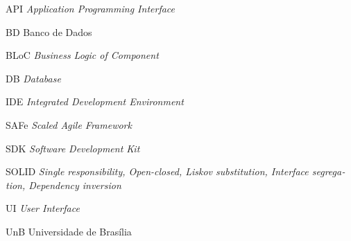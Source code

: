 \documentclass[
	12pt,				%
	oneside,			%
	a4paper,			%
	english,			%
	brazil,				%
	]{abntex2}
\begin{document}

\listoftables*
\cleardoublepage

\begin{siglas}
  \item[API] \foreignlanguage{english}{\textit{Application Programming Interface}}
  \item[BD] Banco de Dados
  \item[BLoC] \foreignlanguage{english}{\textit{Business Logic of Component}}
  \item[DB] \foreignlanguage{english}{\textit{Database}}
  \item[IDE] \foreignlanguage{english}{\textit{Integrated Development Environment}}
  \item[SAFe] \foreignlanguage{english}{\textit{Scaled Agile Framework}}
  \item[SDK] \foreignlanguage{english}{\textit{Software Development Kit}}
  \item[SOLID] \foreignlanguage{english}{\textit{Single responsibility, Open-closed, Liskov substitution, Interface segregation, Dependency inversion}}
  \item[UI] \foreignlanguage{english}{\textit{User Interface}}
  \item[UnB] Universidade de Brasília
\end{siglas}


\tableofcontents*
\cleardoublepage


\textual
\end{document}
